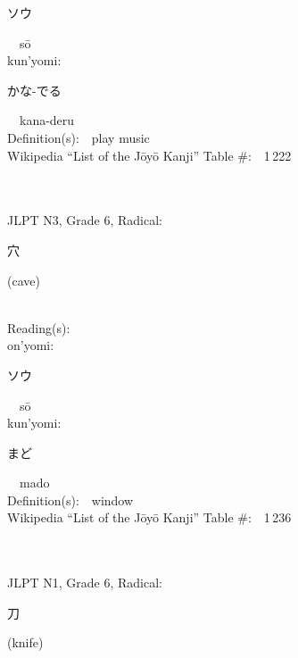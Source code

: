 \begin{multicols}{2}
{\hspace*{2em}}{\begin{CJK}{UTF8}{min} ソウ \end{CJK}}\ \ s\=o\ \ \\
{\hspace*{1em}}kun'yomi:\ \ \\
{\hspace*{2em}}{\begin{CJK}{UTF8}{min} かな-でる \end{CJK}}\ \ kana-deru\ \ \\
Definition(s):\ \ play music \\
Wikipedia ``List of the J\=oy\=o Kanji'' Table \#:\ \ 1\,222 \\
\ \ \\
{\fontsize{34pt}{40pt}  }\ \ \\  %
{JLPT N3, Grade 6, Radical:\ \ {\begin{CJK}{UTF8}{min} 穴 \end{CJK}} (cave) } \\
Reading(s):\ \ \\
{\hspace*{1em}}on'yomi:\ \ \\
{\hspace*{2em}}{\begin{CJK}{UTF8}{min} ソウ \end{CJK}}\ \ s\=o\ \ \\
{\hspace*{1em}}kun'yomi:\ \ \\
{\hspace*{2em}}{\begin{CJK}{UTF8}{min} まど \end{CJK}}\ \ mado\ \ \\
Definition(s):\ \ window \\
Wikipedia ``List of the J\=oy\=o Kanji'' Table \#:\ \ 1\,236 \\
\ \ \\
{\fontsize{34pt}{40pt}  }\ \ \\  %
{JLPT N1, Grade 6, Radical:\ \ {\begin{CJK}{UTF8}{min} 刀 \end{CJK}} (knife) } \\

\end{multicols}

